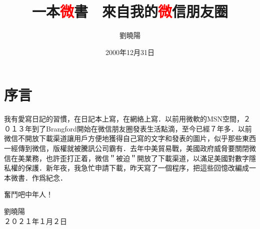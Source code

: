 \documentclass[cn,11pt,chinese]{elegantbook}
\title{一本\textcolor{red}{微}書　來自我的\textcolor{red}{微}信朋友圈}
\author{劉曉陽}
\institute{時光流水}
\date{2000年12月31日}
\begin{document}
\maketitle
\frontmatter
\chapter*{序言}
我有愛寫日記的習慣，在日記本上寫，在網絡上寫．以前用微軟的MSN空間，２０１３年到了Brangford開始在微信朋友圈發表生活點滴，至今已經７年多．以前微信不開放下載渠道讓用戶方便地獲得自己寫的文字和發表的圖片，似乎那些東西一經傳到微信，版權就被騰訊公司霸有．去年中美貿易戰，美國政府威脅要關閉微信在美業務，也許歪打正着，微信＂被迫＂開放了下載渠道，以滿足美國對數字隱私權的保護．新年夜，我急忙申請下載，昨天寫了一個程序，把這些回憶改編成一本微書．作爲紀念．
\par
奮鬥吧中年人！
\vskip 1.5cm
\begin{flushright}
劉曉陽\\
２０２１年１月２日
\end{flushright}
\tableofcontents
\mainmatter
\noindent\makebox[\linewidth]{\rule{\paperwidth}{0.4pt}}

\end{document}
